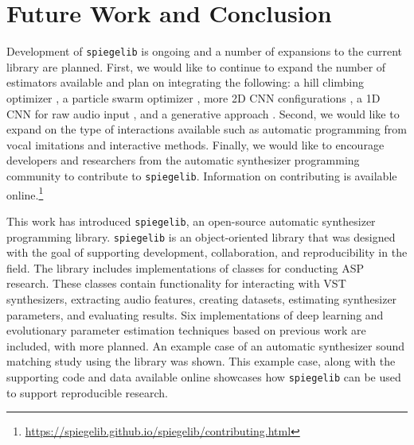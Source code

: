 
\section{Future Work and Conclusion}
Development of \texttt{spiegelib} is ongoing and a number of expansions to the current library are planned. First, we would like to continue to expand the number of estimators available and plan on integrating the following: a hill climbing optimizer \cite{yee2018automatic}, a particle swarm optimizer \cite{heise2009automatic}, more 2D CNN configurations \cite{barkan2019inversynth}, a 1D CNN for raw audio input \cite{barkan2019inversynth}, and a generative approach \cite{esling2020flow}.  Second, we would like to expand on the type of interactions available such as automatic programming from vocal imitations \cite{mcartwright2014} and interactive methods. 
Finally, we would like to encourage developers and researchers from the automatic synthesizer programming community to contribute to \texttt{spiegelib}. Information on contributing is available online.\footnote{\url{https://spiegelib.github.io/spiegelib/contributing.html}} 

This work has introduced \texttt{spiegelib}, an open-source automatic synthesizer programming library. \texttt{spiegelib} is an object-oriented library that was designed with the goal of supporting development, collaboration, and reproducibility in the field. The library includes implementations of classes for conducting ASP research. These classes contain functionality for interacting with VST synthesizers, extracting audio features, creating datasets, estimating synthesizer parameters, and evaluating results. Six implementations of deep learning and evolutionary parameter estimation techniques based on previous work are included, with more planned. An example case of an automatic synthesizer sound matching study using the library was shown. This example case, along with the supporting code and data available online showcases how \texttt{spiegelib} can be used to support reproducible research.
